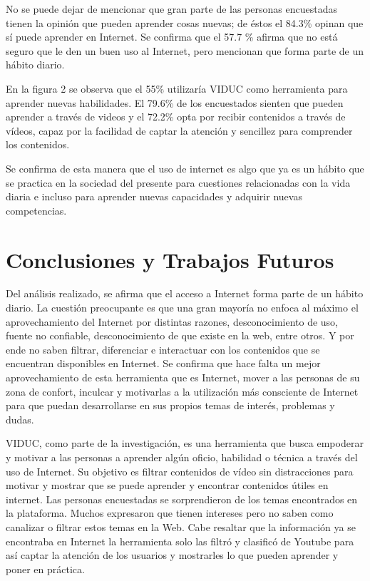 \documentclass[runningheads]{llncs}
\begin{document}
No se puede dejar de mencionar que gran parte de las personas encuestadas tienen la opinión que pueden aprender cosas nuevas; de éstos el 84.3\% opinan que sí puede aprender en Internet. Se confirma que el 57.7 \% afirma que no está seguro que le den un buen uso al Internet, pero mencionan que forma parte de un hábito diario.

En la figura 2 se observa que el 55\% utilizaría VIDUC como herramienta para aprender nuevas habilidades. El 79.6\% de los encuestados sienten que pueden aprender a través de videos y el 72.2\% opta por recibir contenidos a través de vídeos, capaz por la facilidad de captar la atención y sencillez para comprender los contenidos.

Se confirma de esta manera  que el uso de internet es algo que ya es un hábito que se practica  en la sociedad del presente para cuestiones relacionadas con la vida diaria e incluso para aprender nuevas capacidades y adquirir nuevas competencias.

\section{Conclusiones y Trabajos Futuros}
Del análisis realizado, se afirma que el acceso a Internet forma parte de un hábito diario. La cuestión preocupante es que una gran mayoría no enfoca al máximo el aprovechamiento del Internet por distintas razones, desconocimiento de uso, fuente no confiable, desconocimiento de que existe en la web, entre otros. Y por ende no saben filtrar, diferenciar e interactuar con los contenidos que se encuentran disponibles en Internet. Se confirma que hace falta un mejor aprovechamiento de esta herramienta que es Internet, mover a las personas de su zona de confort, inculcar y motivarlas a la utilización más consciente de Internet para que puedan desarrollarse en sus propios temas de interés, problemas y dudas.

VIDUC, como parte de la investigación, es una herramienta que busca empoderar y motivar a las personas a aprender algún oficio, habilidad o técnica a través del uso de Internet. Su objetivo es filtrar contenidos de vídeo sin distracciones para motivar y mostrar que se puede aprender y encontrar contenidos útiles en internet. Las personas encuestadas se sorprendieron de los temas encontrados en la plataforma. Muchos expresaron que tienen intereses pero no saben como canalizar o filtrar estos temas en la Web. Cabe resaltar que la información ya se encontraba en Internet la herramienta solo las filtró y clasificó de Youtube para así captar la atención de los usuarios y mostrarles lo que pueden aprender y poner en práctica.
\end{document}
